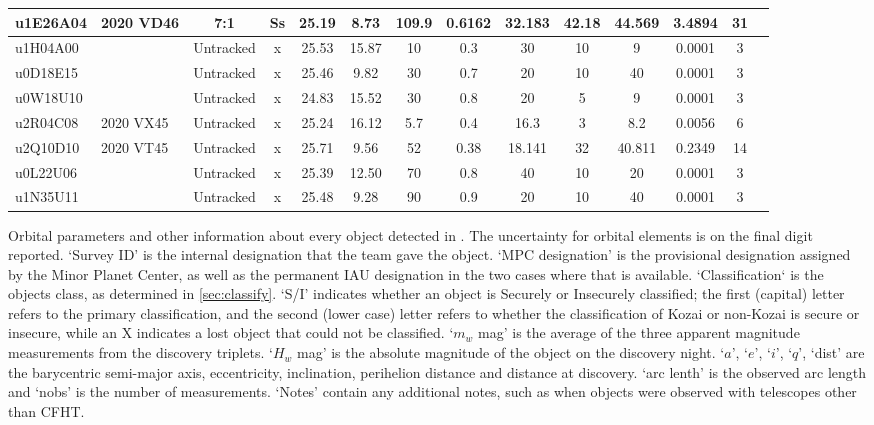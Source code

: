 \begin{longrotatetable}
\begin{longtable}{ll|ccccccccccc | l}
u1E26A04 & 2020 VD46 & 7:1 & Ss & 25.19 & 8.73 & 109.9 & 0.6162 & 32.183 & 42.18 & 44.569 & 3.4894 & 31 & \\ 
\hline
u1H04A00 &  & Untracked & x & 25.53 & 15.87 & 10 & 0.3 & 30 & 10 & 9 & 0.0001 & 3 & \\ 
u0D18E15 &  & Untracked & x & 25.46 & 9.82 & 30 & 0.7 & 20 & 10 & 40 & 0.0001 & 3 & \\ 
u0W18U10 &  & Untracked & x & 24.83 & 15.52 & 30 & 0.8 & 20 & 5 & 9 & 0.0001 & 3 & \\ 
u2R04C08 & 2020 VX45 & Untracked & x & 25.24 & 16.12 & 5.7 & 0.4 & 16.3 & 3 & 8.2 & 0.0056 & 6 & \\ 
u2Q10D10 & 2020 VT45 & Untracked & x & 25.71 & 9.56 & 52 & 0.38 & 18.141 & 32 & 40.811 & 0.2349 & 14 & \\ 
u0L22U06 &  & Untracked & x & 25.39 & 12.50 & 70 & 0.8 & 40 & 10 & 20 & 0.0001 & 3 & \\ 
u1N35U11 &  & Untracked & x & 25.48 & 9.28 & 90 & 0.9 & 20 & 10 & 40 & 0.0001 & 3 & \\ 
\hline\hline
\end{longtable}
\footnotesize{
Orbital parameters and other information about every object detected in \lido.
The uncertainty for orbital elements is on the final digit reported.
`Survey ID' is the internal designation that the \lido team gave the object.
`MPC designation' is the provisional designation assigned by the Minor Planet Center, as well as the permanent IAU designation in the two cases where that is available.
`Classification` is the objects class, as determined in \autoref{sec:classify}.
`S/I' indicates whether an object is Securely or Insecurely classified; the first (capital) letter refers to the primary classification, and the second (lower case) letter refers to whether the classification of Kozai or non-Kozai is secure or insecure, while an X indicates a lost object that could not be classified.
`$m_w$ mag' is the average of the three apparent magnitude measurements from the discovery triplets.
`$H_w$ mag' is the absolute magnitude of the object on the discovery night.
`$a$', `$e$', `$i$', `$q$', `dist' are the barycentric semi-major axis, eccentricity, inclination, perihelion distance and distance at discovery. 
`arc lenth' is the observed arc length and `nobs' is the number of measurements.
`Notes' contain any additional notes, such as when objects were observed with telescopes other than CFHT.
}
\end{longrotatetable}